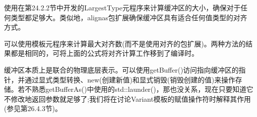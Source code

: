 使用在第24.2.2节中开发的LargestType元程序来计算缓冲区的大小，确保对于任何类型都足够大。类似地，alignas包扩展确保缓冲区具有适合任何值类型的对齐方式。

\begin{notice}可以使用模板元程序来计算最大对齐数(而不是使用对齐的包扩展)。两种方法的结果都是相同的，可将上面的公式将对齐计算工作移到了编译时。
\end{notice}

缓冲区本质上是联合的物理底层表示。可以使用getBuffer()访问指向缓冲区的指针，并通过显式类型转换、new(创建新值)和显式销毁(销毁创建的值)来操作存储。若不熟悉getBufferAs()中使用的std::launder()，那也没关系，现在只要知道它不修改地返回参数就足够了;我们将在讨论Variant模板的赋值操作符时解释其作用(参见第26.4.3节)。






































